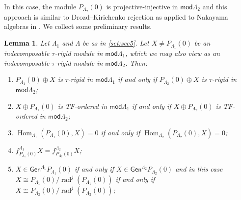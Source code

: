 \documentclass[11pt]{amsart}
\newcommand{\Gen}{\mathsf{Gen}}
\newcommand{\mods}{\mathsf{mod}}
\DeclareMathOperator{\Hom}{\mathrm{Hom}}
\DeclareMathOperator{\rad}{\mathrm{rad}}
\newtheorem{lemma}[theorem]{Lemma}
\theoremstyle{definition}
\begin{document}
In this case, the module $P_{\Lambda_2}(0)$ is projective-injective in $\mods \Lambda_2$ and this approach is similar to Drozd--Kirichenko rejection \cite{DrozdKirichenko} as applied to Nakayama algebras in \cite[Sec. 3]{Adachi2016}. We collect some preliminary results.


\begin{lemma}\label{lem:easylemma}
    Let $\Lambda_1$ and $\Lambda$ be as in \cref{set:sec5}. Let $X \neq P_{\Lambda_1}(0)$ be an indecomposable $\tau$-rigid module in $\mods \Lambda_1$, which we may also view as an indecomposable $\tau$-rigid module in $\mods \Lambda_2$. Then:
    \begin{enumerate}
        \item $P_{\Lambda_1}(0) \oplus X$ is $\tau$-rigid in $\mods \Lambda_1$ if and only if $P_{\Lambda_2}(0) \oplus X$ is $\tau$-rigid in $\mods \Lambda_2$;
        \item $X \oplus P_{\Lambda_1}(0)$ is TF-ordered in $\mods \Lambda_1$ if and only if $X \oplus P_{\Lambda_2}(0)$ is TF-ordered in $\mods \Lambda_2$;
        \item $\Hom_{\Lambda_1}(P_{\Lambda_1}(0), X)= 0$ if and only if $\Hom_{\Lambda_2}(P_{\Lambda_2}(0), X)= 0$;
        \item $f_{P_{\Lambda_1}(0)}^{\Lambda_1} X= f_{P_{\Lambda_2}(0)}^{\Lambda_2} X$;
        \item $X \in \Gen^{\Lambda_1} P_{\Lambda_1}(0)$ if and only if $X \in \Gen^{\Lambda_2} P_{\Lambda_2}(0)$ and in this case $X \cong  P_{\Lambda_1}(0)/ \rad^j (P_{\Lambda_1}(0))$ if and only if $X \cong  P_{\Lambda_2}(0)/ \rad^j (P_{\Lambda_2}(0))$;
    \end{enumerate}
\end{lemma}
\end{document}
